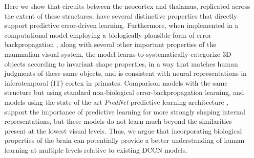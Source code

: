 \documentclass[12pt,twoside]{article}
\newif\myifpdf
\begin{document}
Here we show that circuits between the neocortex and thalamus, replicated across the extent of these structures, have several distinctive properties that directly support predictive error-driven learning. Furthermore, when implemented in a computational model employing a biologically-plausible form of error backpropagation \cite{OReilly96,OReillyMunakata00,OReillyMunakataFrankEtAl12}, along with several other important properties of the mammalian visual system, the model learns to systematically categorize 3D objects according to invariant shape properties, in a way that matches human judgments of these same objects, and is consistent with neural representations in inferotemporal (IT) cortex in primates.  Comparison models with the same structure but using standard non-biological error-backpropagation learning, and models using the state-of-the-art {\em PredNet} predictive learning architecture \cite{LotterKreimanCox16}, support the importance of predictive learning for more strongly shaping internal representations, but these models do not learn much beyond the similarities present at the lowest visual levels.  Thus, we argue that incorporating biological properties of the brain can potentially provide a better understanding of human learning at multiple levels relative to existing DCCN models.

\end{document}
